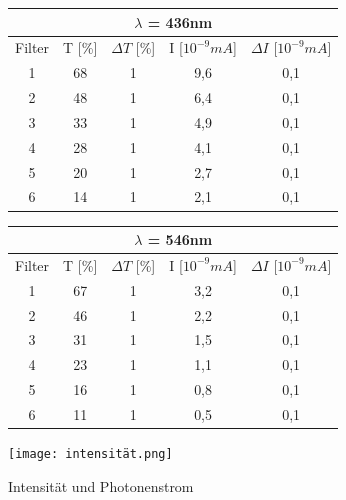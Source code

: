 \documentclass{scrartcl}
\begin{document}
		\begin{figure}[H]
			\begin{center}
				\begin{tabular}{|c|c|c|c|c|}
					\hline
						\multicolumn{5}{|c|}{$\lambda$ = 436nm} \\
					\hline
					Filter & T [\%] & $\Delta T$ [\%] & I [$10^{-9}mA$] & $\Delta I$ [$10^{-9}mA$]\\
					\hline
					1 & 68 & 1 & 9,6 & 0,1\\
					2 & 48 & 1 & 6,4 & 0,1\\
					3 & 33 & 1 & 4,9 & 0,1\\
					4 & 28 & 1 & 4,1 & 0,1\\
					5 & 20 & 1 & 2,7 & 0,1\\
					6 & 14 & 1 & 2,1 & 0,1\\
					\hline
				\end{tabular}
			\end{center}
		\end{figure}
		\begin{figure}[H]
			\begin{center}
				\begin{tabular}{|c|c|c|c|c|}
					\hline
						\multicolumn{5}{|c|}{$\lambda$ = 546nm} \\
					\hline
					Filter & T [\%] & $\Delta T$ [\%] & I [$10^{-9}mA$] & $\Delta I$ [$10^{-9}mA$]\\
					\hline
					1 & 67 & 1 & 3,2 & 0,1\\
					2 & 46 & 1 & 2,2 & 0,1\\
					3 & 31 & 1 & 1,5 & 0,1\\
					4 & 23 & 1 & 1,1 & 0,1\\
					5 & 16 & 1 & 0,8 & 0,1\\
					6 & 11 & 1 & 0,5 & 0,1\\
					\hline
				\end{tabular}
			\end{center}
		\end{figure}

		\begin{figure}[H]
			\centering
			\texttt{[image: intensität.png]}
			\caption{Intensität und Photonenstrom}
		\end{figure}
\end{document}
